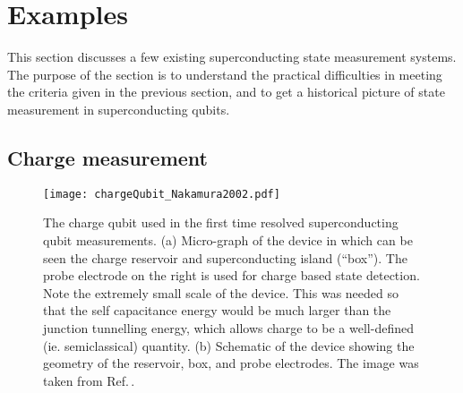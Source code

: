 \section{Examples}

This section discusses a few existing superconducting state measurement systems.
The purpose of the section is to understand the practical difficulties in meeting the criteria given in the previous section, and to get a historical picture of state measurement in superconducting qubits.

\subsection{Charge measurement}

\begin{figure}
\begin{centering}
\texttt{[image: chargeQubit\_Nakamura2002.pdf]} 
\par\end{centering}
\caption{The charge qubit used in the first time resolved superconducting qubit measurements. (a) Micro-graph of the device in which can be seen the charge reservoir and superconducting island (``box''). The probe electrode on the right is used for charge based state detection. Note the extremely small scale of the device. This was needed so that the self capacitance energy would be much larger than the junction tunnelling energy, which allows charge to be a well-defined (ie. semiclassical) quantity. (b) Schematic of the device showing the geometry of the reservoir, box, and probe electrodes. The image was taken from Ref.\,\cite{Nakamura:qubit2002}.}
\label{Fig:chargeQubit}
\end{figure}

